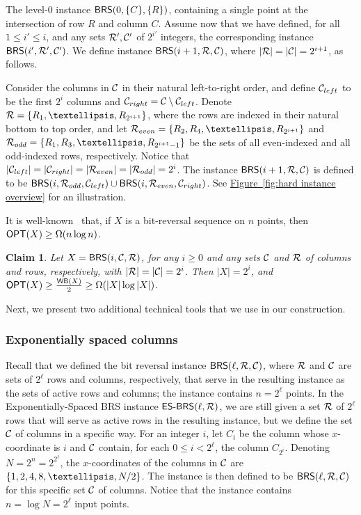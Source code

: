 \documentclass[11pt]{article}
\numberwithin{equation}{section}
\newtheorem{claim}[theorem]{Claim}
\theoremstyle{definition}
\theoremstyle{plain}
\newcommand{\expref}[2]{\hyperref[#2]{#1~\ref{#2}}}
\begin{document}
The level-$0$  instance ${\sf BRS}(0,\{C\}, \{R\})$, containing a single point at the intersection of row $R$ and column $C$. 
Assume now that we have defined, for all $1\leq i'\leq i$, and any sets ${\mathcal R}',{\mathcal C}'$ of $2^{i'}$ integers, the corresponding instance ${\sf BRS}(i',{\mathcal R}',{\mathcal C}')$. We define  instance ${\sf BRS}(i+1,{\mathcal R},{\mathcal C})$, where $|{\mathcal R}| = |{\mathcal C}| = 2^{i+1}$, as follows. 

Consider the columns in ${\mathcal C}$ in their natural left-to-right order, and define ${\mathcal C}_{left}$ to be the first $2^i$ columns and ${\mathcal C}_{right} = {\mathcal C} \setminus {\mathcal C}_{left}$. 
Denote $\rset= \{R_1,\ldots, R_{2^{i+1}}\}$, where the rows are indexed in their natural bottom to top order, and let $\rset_{even}=\{R_2,R_4,\ldots, R_{2^{i+1}}\}$ and $\rset_{odd}=\{R_1,R_3,\ldots, R_{2^{i+1}-1}\}$ be the sets of all even-indexed and all odd-indexed rows, respectively.
Notice that $|{\mathcal C}_{left}| = |{\mathcal C}_{right}| = |{\mathcal R}_{even}| = |{\mathcal R}_{odd}| = 2^i$. 
The instance ${\sf BRS}(i+1, {\mathcal R},{\mathcal C})$ is defined to be ${\sf BRS}(i,{\mathcal R}_{odd},{\mathcal C}_{left}) \cup {\sf BRS}(i,{\mathcal R}_{even}, {\mathcal C}_{right})$. 
See \expref{Figure}{fig:hard instance overview} for an illustration. 

%




It is well-known~\cite{wilber} that, if $X$ is a bit-reversal sequence on $n$ points, then $\mbox{\sf OPT}(X)\geq \Omega(n \log n)$. 

\begin{claim}
\label{claim:BRS complexity} 
Let $X= {\sf BRS}(i,{\mathcal C},{\mathcal R})$, for any $i\geq 0$ and any sets ${\mathcal C}$ and ${\mathcal R}$ of columns and rows, respectively, with $|{\mathcal R}|=|{\mathcal C}|=2^i$. Then $|X| = 2^i$, and $\mbox{\sf OPT}(X) \geq \frac{\mathsf{WB}(X)}{2} \geq \Omega(|X| \log |X|)$.  
\end{claim} 



%
%
%
%
%
%
%
%
%
Next, we present two additional technical tools that we use in our construction. 
 

\subsubsection{Exponentially spaced columns}


Recall that we defined the bit reversal instance ${\sf BRS}(\ell, {\mathcal R}, {\mathcal C})$, where ${\mathcal R}$ and ${\mathcal C}$ are sets of $2^{\ell}$ rows and columns, respectively, that serve in the resulting instance as the sets of active rows and columns; the instance contains $n=2^{\ell}$ points. 
In the Exponentially-Spaced BRS instance $\mbox{\sf{ES-BRS}}(\ell,{\mathcal R})$, we are still given a set ${\mathcal R}$ of $2^{\ell}$ rows that will serve as active rows in the resulting instance, but we define the set ${\mathcal C}$ of columns in a specific way. For an integer $i$, let $C_i$ be the column whose $x$-coordinate is $i$ and ${\mathcal C}$ contain, for each $0\leq  i< 2^{\ell}$, the column $C_{2^i}$. Denoting $N=2^n=2^{2^{\ell}}$, the $x$-coordinates of the columns in ${\mathcal C}$ are $\set{1,2,4,8,\ldots,N/2}$. 
The instance is then defined to be $\mathsf{BRS}(\ell,{\mathcal R},{\mathcal C})$ for this specific set ${\mathcal C}$ of columns.
Notice that the instance contains $n= \log N=  2^{\ell}$ input points.  
\end{document}
